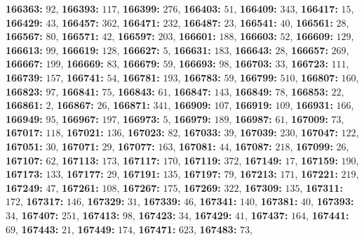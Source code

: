 \textsf{\bfseries 166363:} $92$, \textsf{\bfseries 166393:} $117$, \textsf{\bfseries 166399:} $276$, \textsf{\bfseries 166403:} $51$, \textsf{\bfseries 166409:} $343$, \textsf{\bfseries 166417:} $15$, \textsf{\bfseries 166429:} $43$, \textsf{\bfseries 166457:} $362$, \textsf{\bfseries 166471:} $232$, \textsf{\bfseries 166487:} $23$, \textsf{\bfseries 166541:} $40$, \textsf{\bfseries 166561:} $28$, \textsf{\bfseries 166567:} $80$, \textsf{\bfseries 166571:} $42$, \textsf{\bfseries 166597:} $203$, \textsf{\bfseries 166601:} $188$, \textsf{\bfseries 166603:} $52$, \textsf{\bfseries 166609:} $129$, \textsf{\bfseries 166613:} $99$, \textsf{\bfseries 166619:} $128$, \textsf{\bfseries 166627:} $5$, \textsf{\bfseries 166631:} $183$, \textsf{\bfseries 166643:} $28$, \textsf{\bfseries 166657:} $269$, \textsf{\bfseries 166667:} $199$, \textsf{\bfseries 166669:} $83$, \textsf{\bfseries 166679:} $59$, \textsf{\bfseries 166693:} $98$, \textsf{\bfseries 166703:} $33$, \textsf{\bfseries 166723:} $111$, \textsf{\bfseries 166739:} $157$, \textsf{\bfseries 166741:} $54$, \textsf{\bfseries 166781:} $193$, \textsf{\bfseries 166783:} $59$, \textsf{\bfseries 166799:} $510$, \textsf{\bfseries 166807:} $160$, \textsf{\bfseries 166823:} $97$, \textsf{\bfseries 166841:} $75$, \textsf{\bfseries 166843:} $61$, \textsf{\bfseries 166847:} $143$, \textsf{\bfseries 166849:} $78$, \textsf{\bfseries 166853:} $22$, \textsf{\bfseries 166861:} $2$, \textsf{\bfseries 166867:} $26$, \textsf{\bfseries 166871:} $341$, \textsf{\bfseries 166909:} $107$, \textsf{\bfseries 166919:} $109$, \textsf{\bfseries 166931:} $166$, \textsf{\bfseries 166949:} $95$, \textsf{\bfseries 166967:} $197$, \textsf{\bfseries 166973:} $5$, \textsf{\bfseries 166979:} $189$, \textsf{\bfseries 166987:} $61$, \textsf{\bfseries 167009:} $73$, \textsf{\bfseries 167017:} $118$, \textsf{\bfseries 167021:} $136$, \textsf{\bfseries 167023:} $82$, \textsf{\bfseries 167033:} $39$, \textsf{\bfseries 167039:} $230$, \textsf{\bfseries 167047:} $122$, \textsf{\bfseries 167051:} $30$, \textsf{\bfseries 167071:} $29$, \textsf{\bfseries 167077:} $163$, \textsf{\bfseries 167081:} $44$, \textsf{\bfseries 167087:} $218$, \textsf{\bfseries 167099:} $26$, \textsf{\bfseries 167107:} $62$, \textsf{\bfseries 167113:} $173$, \textsf{\bfseries 167117:} $170$, \textsf{\bfseries 167119:} $372$, \textsf{\bfseries 167149:} $17$, \textsf{\bfseries 167159:} $190$, \textsf{\bfseries 167173:} $133$, \textsf{\bfseries 167177:} $29$, \textsf{\bfseries 167191:} $135$, \textsf{\bfseries 167197:} $79$, \textsf{\bfseries 167213:} $171$, \textsf{\bfseries 167221:} $219$, \textsf{\bfseries 167249:} $47$, \textsf{\bfseries 167261:} $108$, \textsf{\bfseries 167267:} $175$, \textsf{\bfseries 167269:} $322$, \textsf{\bfseries 167309:} $135$, \textsf{\bfseries 167311:} $172$, \textsf{\bfseries 167317:} $146$, \textsf{\bfseries 167329:} $31$, \textsf{\bfseries 167339:} $46$, \textsf{\bfseries 167341:} $140$, \textsf{\bfseries 167381:} $40$, \textsf{\bfseries 167393:} $34$, \textsf{\bfseries 167407:} $251$, \textsf{\bfseries 167413:} $98$, \textsf{\bfseries 167423:} $34$, \textsf{\bfseries 167429:} $41$, \textsf{\bfseries 167437:} $164$, \textsf{\bfseries 167441:} $69$, \textsf{\bfseries 167443:} $21$, \textsf{\bfseries 167449:} $174$, \textsf{\bfseries 167471:} $623$, \textsf{\bfseries 167483:} $73$, 
